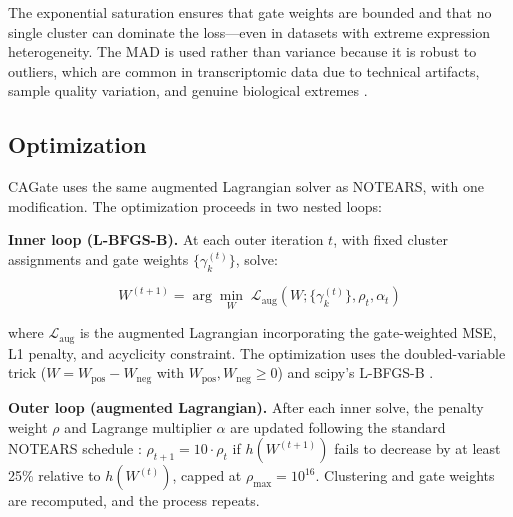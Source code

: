 \documentclass[12pt,a4paper]{article}
\begin{document}
The exponential saturation ensures that gate weights are bounded and that no single cluster can dominate the loss---even in datasets with extreme expression heterogeneity. The MAD is used rather than variance because it is robust to outliers, which are common in transcriptomic data due to technical artifacts, sample quality variation, and genuine biological extremes \cite{Li2018}.









\subsection{Optimization}









CAGate uses the same augmented Lagrangian solver as NOTEARS, with one modification. The optimization proceeds in two nested loops:









\noindent\textbf{Inner loop (L-BFGS-B).} At each outer iteration $t$, with fixed cluster assignments and gate weights $\{\gamma_k^{(t)}\}$, solve:




\begin{equation}




W^{(t+1)} = \arg\min_W \; \mathcal{L}_{\text{aug}}(W; \{\gamma_k^{(t)}\}, \rho_t, \alpha_t)




\end{equation}




where $\mathcal{L}_{\text{aug}}$ is the augmented Lagrangian incorporating the gate-weighted MSE, L1 penalty, and acyclicity constraint. The optimization uses the doubled-variable trick ($W = W_{\text{pos}} - W_{\text{neg}}$ with $W_{\text{pos}}, W_{\text{neg}} \geq 0$) and scipy's L-BFGS-B \cite{Zhu1997}.









\noindent\textbf{Outer loop (augmented Lagrangian).} After each inner solve, the penalty weight $\rho$ and Lagrange multiplier $\alpha$ are updated following the standard NOTEARS schedule \cite{Zheng2018}: $\rho_{t+1} = 10 \cdot \rho_t$ if $h(W^{(t+1)})$ fails to decrease by at least 25\% relative to $h(W^{(t)})$, capped at $\rho_{\max} = 10^{16}$. Clustering and gate weights are recomputed, and the process repeats.
\end{document}
